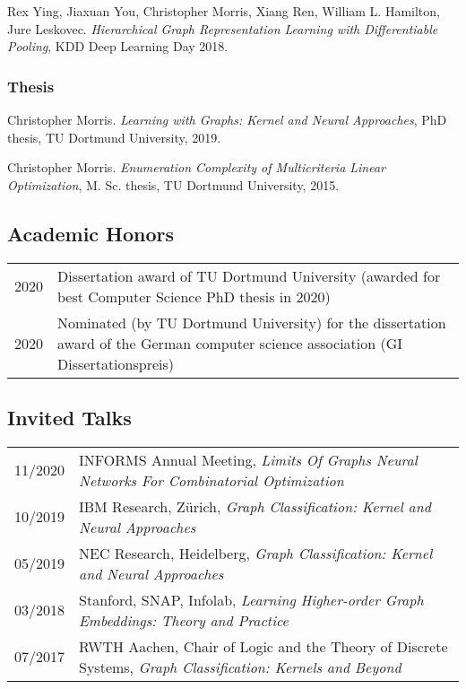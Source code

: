 \documentclass[11pt, a4paper]{scrartcl}
\begin{document}
\begin{thebibliography}{5}
Rex Ying, Jiaxuan You, Christopher Morris, Xiang Ren, William L. Hamilton, Jure Leskovec.
\emph{Hierarchical Graph Representation Learning with Differentiable Pooling},
KDD Deep Learning Day 2018.


\subsubsection*{Thesis}

Christopher Morris.
\emph{Learning with Graphs: Kernel and Neural Approaches}, PhD thesis, TU Dortmund University, 2019.

Christopher Morris.
\emph{Enumeration Complexity of Multicriteria Linear Optimization}, M. Sc. thesis, TU Dortmund University, 2015.

	
\end{thebibliography}

\subsection*{Academic Honors}
\begin{tabular}{p{2.1cm}p{12.0cm}}
	2020& Dissertation award of TU Dortmund University (awarded for best Computer Science PhD thesis in 2020)\\
	2020& Nominated (by TU Dortmund University) for the dissertation award of the German computer science association (GI Dissertationspreis)\\
\end{tabular}

\subsection*{Invited Talks}
\begin{tabular}{p{2.1cm}p{12.0cm}}
11/2020&INFORMS Annual Meeting, \emph{Limits Of Graphs Neural Networks For Combinatorial Optimization} \\
10/2019&IBM Research, Zürich, \emph{Graph Classification: Kernel and Neural Approaches}\\
05/2019&NEC Research, Heidelberg, \emph{Graph Classification: Kernel and Neural Approaches}\\ 
03/2018&Stanford, SNAP, Infolab, \emph{Learning Higher-order Graph Embeddings: Theory and Practice}\\
07/2017&RWTH Aachen, Chair of Logic and the Theory of Discrete Systems, \emph{Graph Classification: Kernels and Beyond}\\

\end{tabular}
\end{document}
